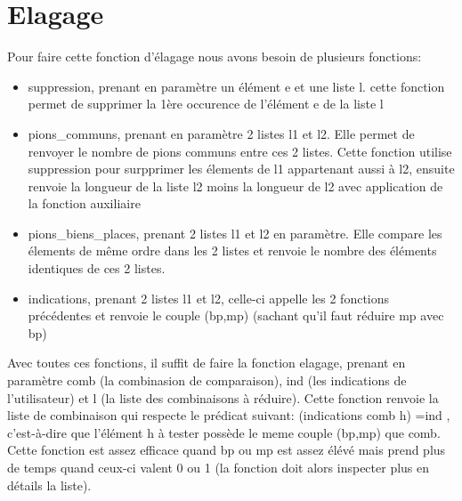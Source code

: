 \documentclass[a4paper,twoside,12pt]{report}
\newcommand{\moncode}[1]{\begin{center}
                        
                        \end{center}}
\begin{document}
\section{Elagage}
\par
Pour faire cette fonction d'élagage nous avons besoin de plusieurs fonctions:
\begin{itemize}
\item suppression, prenant en paramètre un élément e et une liste l. cette fonction permet de supprimer la 1ère occurence de l'élément e de la liste l
\item pions\_communs, prenant en paramètre 2 listes l1 et l2. Elle permet de renvoyer le nombre de pions communs entre ces 2 listes. Cette fonction utilise suppression pour surpprimer les élements de l1 appartenant aussi à l2, ensuite renvoie la longueur de la liste l2 moins la longueur de l2 avec application de la fonction auxiliaire
\item pions\_biens\_places, prenant 2 listes l1 et l2 en paramètre. Elle compare les élements de même ordre dans les 2 listes et renvoie le nombre des éléments identiques de ces 2 listes.
\item indications, prenant 2 listes l1 et l2, celle-ci appelle les 2 fonctions précédentes et renvoie le couple (bp,mp) (sachant qu'il faut réduire mp avec bp)
\end{itemize}
\par
Avec toutes ces fonctions, il suffit de faire la fonction elagage, prenant en paramètre comb (la combinasion de comparaison), ind (les indications de l'utilisateur) et l (la liste des combinaisons à réduire). Cette fonction renvoie la liste de combinaison qui respecte le prédicat suivant: (indications comb h) =ind , c'est-à-dire que l'élément h à tester possède le meme couple (bp,mp) que comb. Cette fonction est assez efficace quand bp ou mp est assez élévé mais prend plus de temps quand ceux-ci valent 0 ou 1 (la fonction doit alors inspecter plus en détails la liste).

%
\end{document}
